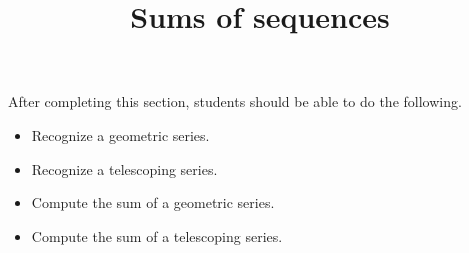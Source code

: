 \documentclass{ximera}
\title{Sums of sequences}
\begin{document}
\begin{abstract}
\end{abstract}

\maketitle

\begin{sectionOutcomes}

After completing this section, students should be able to do the following.

\begin{itemize}
\item Recognize a geometric series.
\item Recognize a telescoping series.
\item Compute the sum of a geometric series.
\item Compute the sum of a telescoping series.
\end{itemize}

\end{sectionOutcomes}
\end{document}
